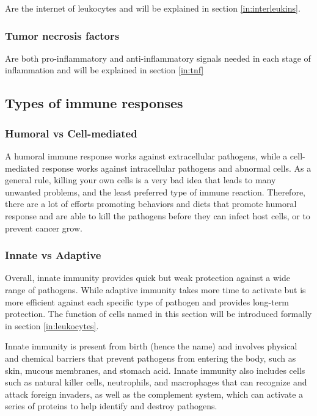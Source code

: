    Are the internet of leukocytes and will be explained in section \ref{in:interleukins}.

\subsubsection{Tumor necrosis factors}

    Are both pro-inflammatory and anti-inflammatory signals needed in each stage of inflammation and will be explained in section \ref{in:tnf}    

\subsection{Types of immune responses}

\subsubsection{Humoral vs Cell-mediated}

A humoral immune response works against extracellular pathogens, while a cell-mediated response works against intracellular pathogens and abnormal cells. As a general rule, killing your own cells is a very bad idea that leads to many unwanted problems, and the least preferred type of immune reaction. Therefore, there are a lot of efforts promoting behaviors and diets that promote humoral response and are able to kill the pathogens before they can infect host cells, or to prevent cancer grow.



\subsubsection{Innate vs Adaptive}
\label{in:InnVSAdap}

Overall, innate immunity provides quick but weak protection against a wide range of pathogens. While adaptive immunity takes more time to activate but is more efficient against each specific type of pathogen and provides long-term protection. The function of cells named in this section will be introduced formally in section \ref{in:leukocytes}.

Innate immunity is present from birth (hence the name) and involves physical and chemical barriers that prevent pathogens from entering the body, such as skin, mucous membranes, and stomach acid. Innate immunity also includes cells such as natural killer cells, neutrophils, and macrophages that can recognize and attack foreign invaders, as well as the complement system, which can activate a series of proteins to help identify and destroy pathogens.

